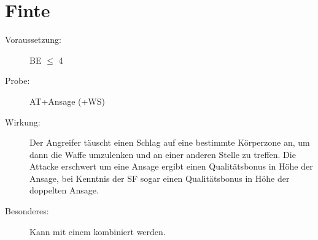 \section{Finte}
\label{aktion.finte}
\begin{description}
    \item[Voraussetzung:]
        BE\textrm{ ${\leq}$ }4
    \item[Probe:]
        AT+Ansage (+WS)
    \item[Wirkung:]
        Der Angreifer täuscht einen Schlag auf eine bestimmte Körperzone an, um dann die Waffe umzulenken und an einer anderen Stelle zu treffen.
        Die Attacke erschwert um eine Ansage ergibt einen Qualitätsbonus in Höhe der Ansage, bei Kenntnis der SF  sogar einen Qualitätsbonus in Höhe der doppelten Ansage.
    \item[Besonderes:]
        Kann mit einem  kombiniert werden.
\end{description}
